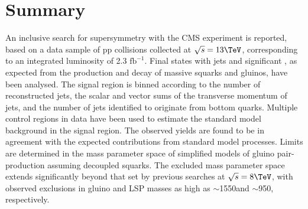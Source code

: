 \section{Summary}
\label{sec:summary}

An inclusive search for supersymmetry with the CMS experiment is
reported, based on a data sample of pp collisions collected at
$\sqrt{s} = 13\TeV$, corresponding to an integrated luminosity of 2.3
$\mathrm{fb}^{-1}$.  Final states with jets and significant \ETmiss,
as expected from the production and decay of massive squarks and
gluinos, have been analysed. The signal region is binned according to
the number of reconstructed jets, the scalar and vector sums of the
transverse momentum of jets, and the number of jets identified to
originate from bottom quarks.  Multiple control regions in data have
been used to estimate the standard model background in the signal
region.  The observed yields are found to be in agreement with the
expected contributions from standard model processes. Limits are
determined in the mass parameter space of simplified models of gluino
pair-production assuming decoupled squarks. The excluded mass
parameter space extends significantly beyond that set by previous
searches at $\sqrt{s} = 8\TeV$, with observed exclusions in gluino and
LSP masses as high as $\sim$1550\gev and $\sim$950\gev, respectively.
